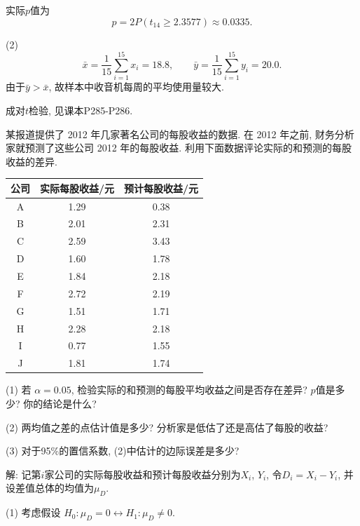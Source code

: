 \documentclass[standard]{ExBook}
\renewenvironment{shaded}{%
  \def\FrameCommand{\fboxsep=\FrameSep \colorbox{shadecolor}}%
  \MakeFramed{\advance\hsize-\width \FrameRestore}%
}{%
  \endMakeFramed
}
\begin{document}
\begin{qitems}
实际$p$值为
$$
p
=
2P\left(t_{14}\geq2.3577\right)
\approx0.0335.
$$

(2)
$$
\bar{x}
=
\frac{1}{15}\sum_{i=1}^{15}x_i
=18.8,
\qquad
\bar{y}
=
\frac{1}{15}\sum_{i=1}^{15}y_i
=20.0.
$$
由于$\bar{y}>\bar{x}$, 故样本中收音机每周的平均使用量较大.

\textcolor{themeColor}{\selectfont {} 成对$t$检验, 见课本P285-P286.}

\vspace{2.5cm-5em}

    \begin{bbox}
    \begin{shaded}
        \qitem
某报道提供了 2012 年几家著名公司的每股收益的数据. 在 2012 年之前, 财务分析家就预测了这些公司 2012 年的每股收益. 利用下面数据评论实际的和预测的每股收益的差异.
\begin{center}
\setlength{\tabcolsep}{45pt}
\begin{tabular}{ccc}
\hline
公司 & 实际每股收益/元 & 预计每股收益/元 \\
\hline
A & 1.29 & 0.38 \\
B & 2.01 & 2.31 \\
C & 2.59 & 3.43 \\
D & 1.60 & 1.78 \\
E & 1.84 & 2.18 \\
F & 2.72 & 2.19 \\
G & 1.51 & 1.71 \\
H & 2.28 & 2.18 \\
I & 0.77 & 1.55 \\
J & 1.81 & 1.74 \\
\hline
\end{tabular}
\end{center}
(1) 若 $\alpha=0.05$, 检验实际的和预测的每股平均收益之间是否存在差异? $p$值是多少? 你的结论是什么?

(2) 两均值之差的点估计值是多少? 分析家是低估了还是高估了每股的收益?

(3) 对于95\%的置信系数, (2)中估计的边际误差是多少?
    \end{shaded}
    \end{bbox}

\vspace{\dimexpr2.5cm-5em\relax}

解: 记第$i$家公司的实际每股收益和预计每股收益分别为$X_i$, $Y_i$, 令$D_i=X_i-Y_i$, 并设差值总体的均值为$\mu_D$.

(1) 考虑假设
$
H_0:\mu_D=0
\longleftrightarrow
H_1:\mu_D\neq0
$.


\end{qitems}
\end{document}
